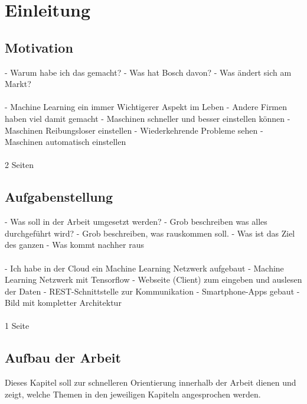 \chapter{Einleitung}
\label{ch:einleitung}

\section{Motivation}
\label{sec:motivation}
- Warum habe ich das gemacht?
- Was hat Bosch davon?
- Was ändert sich am Markt?
\\ \\
- Machine Learning ein immer Wichtigerer Aspekt im Leben
- Andere Firmen haben viel damit gemacht
- Maschinen schneller und besser einstellen können
- Maschinen Reibungsloser einstellen
- Wiederkehrende Probleme sehen
- Maschinen automatisch einstellen
\\ \\
2 Seiten

\section{Aufgabenstellung}
\label{sec:aufgabenstellung}
- Was soll in der Arbeit umgesetzt werden?
- Grob beschreiben was alles durchgeführt wird?
- Grob beschreiben, was rauskommen soll.
- Was ist das Ziel des ganzen
- Was kommt nachher raus
\\ \\
- Ich habe in der Cloud ein Machine Learning Netzwerk aufgebaut
- Machine Learning Netzwerk mit Tensorflow
- Webseite (Client) zum eingeben und auslesen der Daten
- REST-Schnittstelle zur Kommunikation
- Smartphone-Apps gebaut
- Bild mit kompletter Architektur
\\ \\
1 Seite

\newpage

\section{Aufbau der Arbeit}
\label{sec:aufbauDerArbeit}
Dieses Kapitel soll zur schnelleren Orientierung innerhalb der Arbeit dienen und zeigt, welche Themen in den jeweiligen
Kapiteln angesprochen werden.

